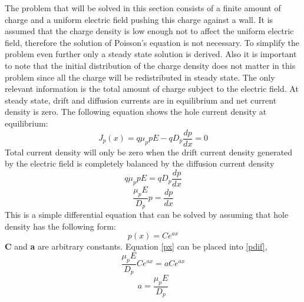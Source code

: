 \begin{doublespace}
The problem that will be solved in this section consists of a finite amount of charge and a uniform electric field pushing this charge against a wall. It is assumed that the charge density is low enough not to affect the uniform electric field, therefore the solution of Poisson's equation is not necessary. To simplify the problem even further only a steady state solution is derived. Also it is important to note that the initial distribution of the charge density does not matter in this problem since all the charge will be redistributed in steady state. The only relevant information is the total amount of charge subject to the electric field. At steady state, drift and diffusion currents are in equilibrium and net current density is zero. The following equation shows the hole current density at equilibrium:
\begin{equation}
J_p(x)=q \mu_{p} p E-qD_{p} \frac{dp}{dx} =0
\end{equation}
Total current density will only be zero when the drift current density generated by the electric field is completely balanced by the diffusion current density 
\begin{equation}
q \mu_{p} p E=qD_{p} \frac{dp}{dx}
\end{equation}
\begin{equation}
 \frac{\mu_{p} E}{D_{p}} p  = \frac{dp}{dx}
 \label{pdif}
\end{equation}
This is a simple differential equation that can be solved by assuming that hole density has the following form:
\begin{equation}
p(x)=Ce^{ax}
\label{px}
\end{equation}
\textbf{C} and \textbf{a} are arbitrary constants. Equation \eqref{px} can be placed into \eqref{pdif},
\begin{equation}
 \frac{\mu_{p} E}{D_{p}} Ce^{ax}  = a Ce^{ax}
\end{equation}
\begin{equation}
a=\frac{\mu_{p} E}{D_{p}}
\end{equation}


\end{doublespace}
